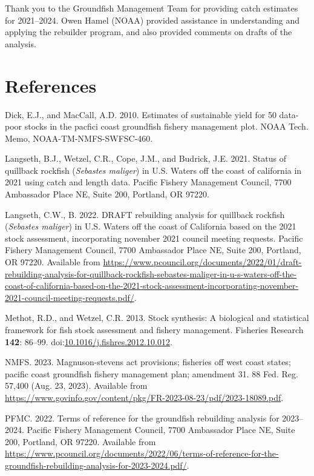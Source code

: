 \documentclass[11pt,
  letterpaper,
]{article}
\newlength{\cslhangindent}
\newenvironment{CSLReferences}[2] %
 {%
  \setlength{\parindent}{0pt}
  \ifodd #1 \everypar{\setlength{\hangindent}{\cslhangindent}}\ignorespaces\fi
  \ifnum #2 > 0
  \setlength{\parskip}{#2\baselineskip}
  \fi
 }%
 {}
\begin{document}
Thank you to the Groundfish Management Team for providing catch estimates for 2021--2024. Owen Hamel (NOAA) provided assistance in understanding and applying the rebuilder program, and also provided comments on drafts of the analysis.

\clearpage

\hypertarget{references}{%
\section{References}\label{references}}

\hypertarget{refs}{}
\begin{CSLReferences}{1}{0}
\leavevmode{}%
Dick, E.J., and MacCall, A.D. 2010. Estimates of sustainable yield for 50 data-poor stocks in the pacfici coast groundfish fishery management plot. NOAA Tech. Memo, NOAA-TM-NMFS-SWFSC-460.

\leavevmode{}%
Langseth, B.J., Wetzel, C.R., Cope, J.M., and Budrick, J.E. 2021. Status of quillback rockfish (\emph{{Sebastes} maliger}) in {U}.{S}. Waters off the coast of california in 2021 using catch and length data. Pacific Fishery Management Council, 7700 Ambassador Place NE, Suite 200, Portland, OR 97220.

\leavevmode{}%
Langseth, C.W., B. 2022. DRAFT rebuilding analysis for quillback rockfish (\emph{{S}ebastes maliger}) in {U}.{S}. Waters off the coast of {C}alifornia based on the 2021 stock assessment, incorporating november 2021 council meeting requests. Pacific Fishery Management Council, 7700 Ambassador Place NE, Suite 200, Portland, OR 97220. Available from \url{https://www.pcouncil.org/documents/2022/01/draft-rebuilding-analysis-for-quillback-rockfish-sebastes-maliger-in-u-s-waters-off-the-coast-of-california-based-on-the-2021-stock-assessment-incorporating-november-2021-council-meeting-requests.pdf/}.

\leavevmode{}%
Methot, R.D., and Wetzel, C.R. 2013. Stock synthesis: A biological and statistical framework for fish stock assessment and fishery management. Fisheries Research \textbf{142}: 86--99. doi:\href{https://doi.org/10.1016/j.fishres.2012.10.012}{10.1016/j.fishres.2012.10.012}.

\leavevmode{}%
NMFS. 2023. Magnuson-stevens act provisions; fisheries off west coast states; pacific coast groundfish fishery management plan; amendment 31. 88 Fed. Reg. 57,400 (Aug. 23, 2023). Available from \url{https://www.govinfo.gov/content/pkg/FR-2023-08-23/pdf/2023-18089.pdf}.

\leavevmode{}%
PFMC. 2022. Terms of reference for the groundfish rebuilding analysis for 2023--2024. Pacific Fishery Management Council, 7700 Ambassador Place NE, Suite 200, Portland, OR 97220. Available from \url{https://www.pcouncil.org/documents/2022/06/terms-of-reference-for-the-groundfish-rebuilding-analysis-for-2023-2024.pdf/}.

\end{CSLReferences}
\end{document}
